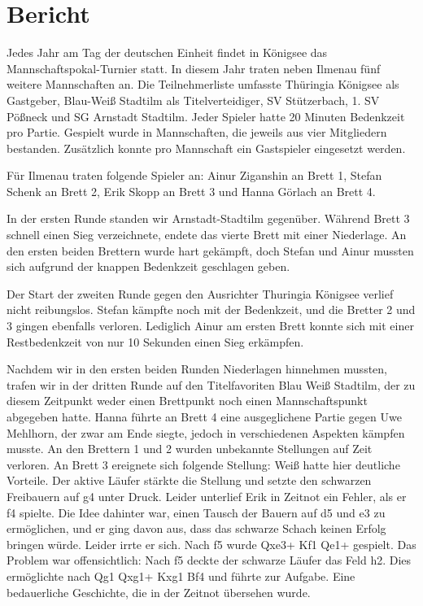 \documentclass[a4paper,ngerman]{tui-algo-seminar}
\title{\inhalt}
\author{Erik Skopp}
\newcommand{\inhalt}{29. Mannschafts Schnellschach Pokalturnier in Königssee 2023}
\begin{document}
\maketitle
\begin{abstract}
Bericht über das \inhalt
\end{abstract}

\section{Bericht}
Jedes Jahr am Tag der deutschen Einheit findet in Königsee das Mannschaftspokal-Turnier statt. In diesem Jahr traten neben Ilmenau fünf weitere Mannschaften an. Die Teilnehmerliste umfasste Thüringia Königsee als Gastgeber, Blau-Weiß Stadtilm als Titelverteidiger, SV Stützerbach, 1. SV Pößneck und SG Arnstadt Stadtilm. Jeder Spieler hatte 20 Minuten Bedenkzeit pro Partie. Gespielt wurde in Mannschaften, die jeweils aus vier Mitgliedern bestanden. Zusätzlich konnte pro Mannschaft ein Gastspieler eingesetzt werden.

Für Ilmenau traten folgende Spieler an: Ainur Ziganshin an Brett 1, Stefan Schenk an Brett 2, Erik Skopp an Brett 3 und Hanna Görlach an Brett 4.

In der ersten Runde standen wir Arnstadt-Stadtilm gegenüber. Während Brett 3 schnell einen Sieg verzeichnete, endete das vierte Brett mit einer Niederlage. An den ersten beiden Brettern wurde hart gekämpft, doch Stefan und Ainur mussten sich aufgrund der knappen Bedenkzeit geschlagen geben.

Der Start der zweiten Runde gegen den Ausrichter Thuringia Königsee verlief nicht reibungslos. Stefan kämpfte noch mit der Bedenkzeit, und die Bretter 2 und 3 gingen ebenfalls verloren. Lediglich Ainur am ersten Brett konnte sich mit einer Restbedenkzeit von nur 10 Sekunden einen Sieg erkämpfen.

Nachdem wir in den ersten beiden Runden Niederlagen hinnehmen mussten, trafen wir in der dritten Runde auf den Titelfavoriten Blau Weiß Stadtilm, der zu diesem Zeitpunkt weder einen Brettpunkt noch einen Mannschaftspunkt abgegeben hatte. Hanna führte an Brett 4 eine ausgeglichene Partie gegen Uwe Mehlhorn, der zwar am Ende siegte, jedoch in verschiedenen Aspekten kämpfen musste. An den Brettern 1 und 2 wurden unbekannte Stellungen auf Zeit verloren. An Brett 3 ereignete sich folgende Stellung: Weiß hatte hier deutliche Vorteile. Der aktive Läufer stärkte die Stellung und setzte den schwarzen Freibauern auf g4 unter Druck. Leider unterlief Erik in Zeitnot ein Fehler, als er f4 spielte. Die Idee dahinter war, einen Tausch der Bauern auf d5 und e3 zu ermöglichen, und er ging davon aus, dass das schwarze Schach keinen Erfolg bringen würde. Leider irrte er sich. Nach f5 wurde Qxe3+ Kf1 Qe1+ gespielt. Das Problem war offensichtlich: Nach f5 deckte der schwarze Läufer das Feld h2. Dies ermöglichte nach Qg1 Qxg1+ Kxg1 Bf4 und führte zur Aufgabe. Eine bedauerliche Geschichte, die in der Zeitnot übersehen wurde.
\end{document}
